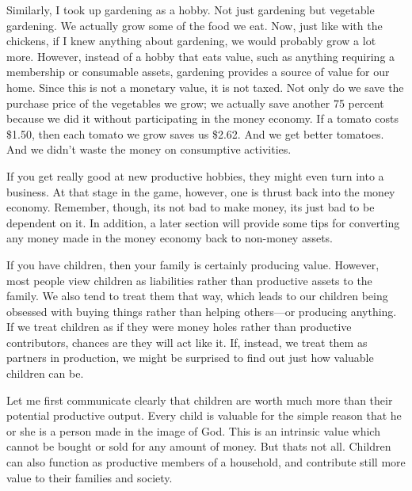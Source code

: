 \documentclass[letterpaper]{article}
\begin{document}
{\color{black}
Similarly, I took up gardening as a hobby. Not just gardening but
vegetable gardening. We actually grow some of the food we eat. Now,
just like with the chickens, if I knew anything about gardening, we
would probably grow a lot more. However, instead of a hobby that eats
value, such as anything requiring a membership or consumable assets,
gardening provides a source of value for our home. Since this is not a
monetary value, it is not taxed. Not only do we save the purchase price
of the vegetables we grow; we actually save another 75 percent because
we did it without participating in the money economy. If a tomato costs
\$1.50, then each tomato we grow saves us \$2.62. And we get better
tomatoes. And we didn’t waste the money on consumptive activities.}

{\color[rgb]{0.32941177,0.5529412,0.83137256}
If you get really good at new productive hobbies, they might even turn
into a business. At that stage in the game, however, one is thrust back
into the money economy.  Remember, though, it{\textquotesingle}s not
bad to make money, it{\textquotesingle}s just bad to be dependent on
it.  In addition, a later section will provide some tips for converting
any money made in the money economy back to non-money assets. }

{\color{black}
If you have children, then your family is certainly producing value.
However, most people view children as liabilities rather than
productive assets to the family. We also tend to treat them that way,
which leads to our children being obsessed with buying things rather
than helping others\textcolor[rgb]{0.32941177,0.5529412,0.83137256}{—or
producing anything}. If we treat
\textcolor[rgb]{0.32941177,0.5529412,0.83137256}{children as if they
were money holes} rather than productive contributors, chances are they
will act like it. If, instead, we treat them as partners in production,
we might be surprised to find out just how valuable children can be. }

{\color{black}
\textcolor[rgb]{0.32941177,0.5529412,0.83137256}{Let me first
communicate clearly that c}hildren are worth
\textcolor[rgb]{0.32941177,0.5529412,0.83137256}{much }more than their
potential productive output. Every child is valuable for the simple
reason that he or she is a person made in the image of God.  This is an
intrinsic value which cannot be bought or sold for any amount of money.
 But that{\textquotesingle}s not all.  Children can also function as
productive members of a  household, and contribute still more value to
their families and society.}
\end{document}
